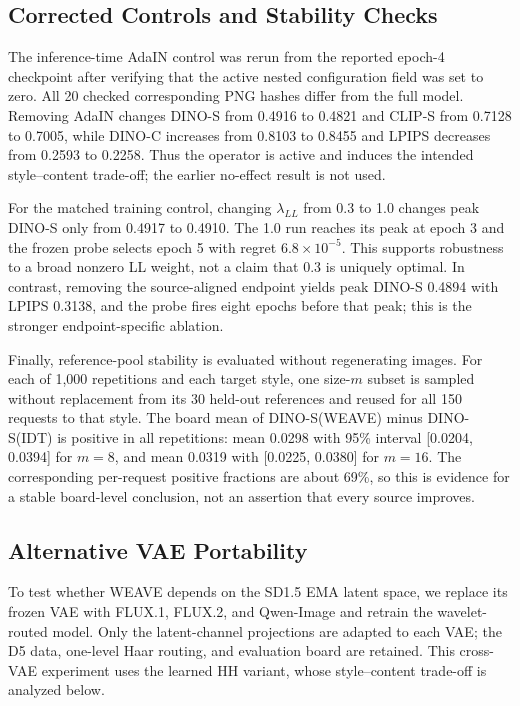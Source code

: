 \documentclass[letterpaper]{article}
\newcommand{\weave}{WEAVE}
\begin{document}
\subsection{Corrected Controls and Stability Checks}

The inference-time AdaIN control was rerun from the reported epoch-4 checkpoint after
verifying that the active nested configuration field was set to zero. All 20 checked
corresponding PNG hashes differ from the full model. Removing AdaIN changes DINO-S from
0.4916 to 0.4821 and CLIP-S from 0.7128 to 0.7005, while DINO-C increases from 0.8103 to
0.8455 and LPIPS decreases from 0.2593 to 0.2258. Thus the operator is active and induces
the intended style--content trade-off; the earlier no-effect result is not used.

For the matched training control, changing $\lambda_{LL}$ from 0.3 to 1.0 changes peak
DINO-S only from 0.4917 to 0.4910. The 1.0 run reaches its peak at epoch 3 and the frozen
probe selects epoch 5 with regret $6.8\times10^{-5}$. This supports robustness to a broad
nonzero LL weight, not a claim that 0.3 is uniquely optimal. In contrast, removing the
source-aligned endpoint yields peak DINO-S 0.4894 with LPIPS 0.3138, and the probe fires
eight epochs before that peak; this is the stronger endpoint-specific ablation.

Finally, reference-pool stability is evaluated without regenerating images. For each of
1,000 repetitions and each target style, one size-$m$ subset is sampled without replacement
from its 30 held-out references and reused for all 150 requests to that style. The board mean
of DINO-S(\weave{}) minus DINO-S(IDT) is positive in all repetitions: mean 0.0298 with
95\% interval [0.0204, 0.0394] for $m=8$, and mean 0.0319 with [0.0225, 0.0380] for
$m=16$. The corresponding per-request positive fractions are about 69\%, so this is
evidence for a stable board-level conclusion, not an assertion that every source improves.

\subsection{Alternative VAE Portability}

To test whether WEAVE depends on the SD1.5 EMA latent space, we replace its frozen VAE with
FLUX.1, FLUX.2, and Qwen-Image and retrain the wavelet-routed model. Only the latent-channel
projections are adapted to each VAE; the D5 data, one-level Haar routing, and evaluation
board are retained. This cross-VAE experiment uses the learned HH variant, whose
style--content trade-off is analyzed below.
\end{document}

